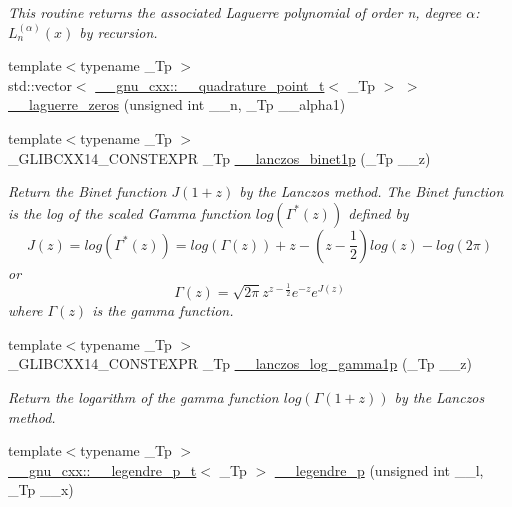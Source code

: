 \begin{DoxyCompactItemize}
\begin{DoxyCompactList}\small\item\em This routine returns the associated Laguerre polynomial of order {\ttfamily n}, degree {\ttfamily $ \alpha $}\+: $ L_n^{(\alpha)}(x) $ by recursion. \end{DoxyCompactList}\item 
{\footnotesize template$<$typename \+\_\+\+Tp $>$ }\\std\+::vector$<$ \hyperlink{struct____gnu__cxx_1_1____quadrature__point__t}{\+\_\+\+\_\+gnu\+\_\+cxx\+::\+\_\+\+\_\+quadrature\+\_\+point\+\_\+t}$<$ \+\_\+\+Tp $>$ $>$ \hyperlink{namespacestd_1_1____detail_a12f5145d6544afee991b30a30020e86b}{\+\_\+\+\_\+laguerre\+\_\+zeros} (unsigned int \+\_\+\+\_\+n, \+\_\+\+Tp \+\_\+\+\_\+alpha1)
\item 
{\footnotesize template$<$typename \+\_\+\+Tp $>$ }\\\+\_\+\+G\+L\+I\+B\+C\+X\+X14\+\_\+\+C\+O\+N\+S\+T\+E\+X\+PR \+\_\+\+Tp \hyperlink{namespacestd_1_1____detail_a84722b82d6d614aa4653eb7559f7d508}{\+\_\+\+\_\+lanczos\+\_\+binet1p} (\+\_\+\+Tp \+\_\+\+\_\+z)
\begin{DoxyCompactList}\small\item\em Return the Binet function $ J(1+z) $ by the Lanczos method. The Binet function is the log of the scaled Gamma function $ log(\Gamma^*(z)) $ defined by \[ J(z) = log(\Gamma^*(z)) = log\left(\Gamma(z)\right) + z - \left(z-\frac{1}{2}\right) log(z) - log(2\pi) \] or \[ \Gamma(z) = \sqrt{2\pi}z^{z-\frac{1}{2}}e^{-z}e^{J(z)} \] where $ \Gamma(z) $ is the gamma function. \end{DoxyCompactList}\item 
{\footnotesize template$<$typename \+\_\+\+Tp $>$ }\\\+\_\+\+G\+L\+I\+B\+C\+X\+X14\+\_\+\+C\+O\+N\+S\+T\+E\+X\+PR \+\_\+\+Tp \hyperlink{namespacestd_1_1____detail_a4586aeea80ba556ab8d6393dadb05c5c}{\+\_\+\+\_\+lanczos\+\_\+log\+\_\+gamma1p} (\+\_\+\+Tp \+\_\+\+\_\+z)
\begin{DoxyCompactList}\small\item\em Return the logarithm of the gamma function $ log(\Gamma(1+z)) $ by the Lanczos method. \end{DoxyCompactList}\item 
{\footnotesize template$<$typename \+\_\+\+Tp $>$ }\\\hyperlink{struct____gnu__cxx_1_1____legendre__p__t}{\+\_\+\+\_\+gnu\+\_\+cxx\+::\+\_\+\+\_\+legendre\+\_\+p\+\_\+t}$<$ \+\_\+\+Tp $>$ \hyperlink{namespacestd_1_1____detail_ab06b50bbac9758b5a2cc7d3d8213daa9}{\+\_\+\+\_\+legendre\+\_\+p} (unsigned int \+\_\+\+\_\+l, \+\_\+\+Tp \+\_\+\+\_\+x)

\end{DoxyCompactItemize}
